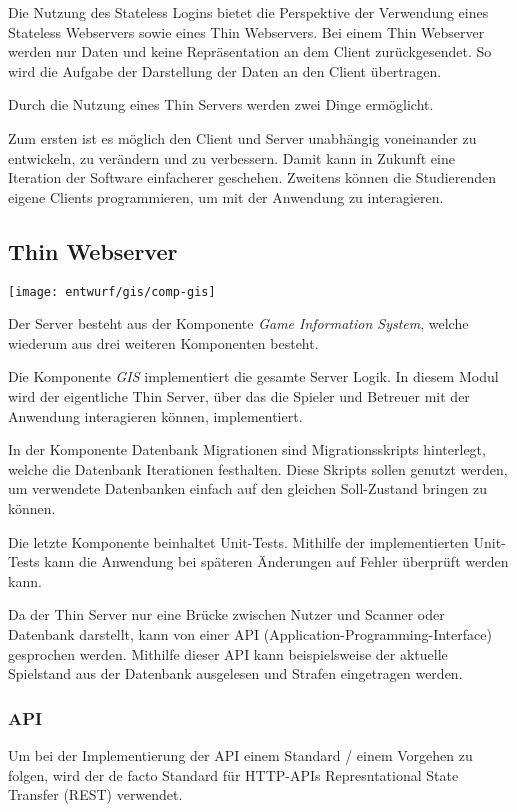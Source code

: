 Die Nutzung des Stateless Logins bietet die Perspektive der Verwendung eines Stateless Webservers sowie eines Thin Webservers. Bei einem Thin Webserver werden nur Daten und keine Repräsentation an dem Client zurückgesendet. So wird die Aufgabe der Darstellung der Daten an den Client übertragen.

Durch die Nutzung eines Thin Servers werden zwei Dinge ermöglicht. 

Zum ersten ist es möglich den Client und Server unabhängig voneinander zu entwickeln, zu verändern und zu verbessern. Damit kann in Zukunft eine Iteration der Software einfacherer geschehen. Zweitens können die Studierenden eigene Clients programmieren, um mit der Anwendung zu interagieren.

\subsection{Thin Webserver}
\begin{center}
	\texttt{[image: entwurf/gis/comp-gis]}
\end{center}

Der Server besteht aus der Komponente \textit{Game Information System}, welche wiederum aus drei weiteren Komponenten besteht. 

Die Komponente \textit{GIS} implementiert die gesamte Server Logik. In diesem Modul wird der eigentliche Thin Server, über das die Spieler und Betreuer mit der Anwendung interagieren können, implementiert.

In der Komponente Datenbank Migrationen sind Migrationsskripts hinterlegt, welche die Datenbank Iterationen festhalten. Diese Skripts sollen genutzt werden, um verwendete Datenbanken einfach auf den gleichen Soll-Zustand bringen zu können. 

Die letzte Komponente beinhaltet Unit-Tests. Mithilfe der implementierten Unit-Tests kann die Anwendung bei späteren Änderungen auf Fehler überprüft werden kann.


Da der Thin Server nur eine Brücke zwischen Nutzer und Scanner oder Datenbank darstellt, kann von einer API (Application-Programming-Interface) gesprochen werden. Mithilfe dieser API kann beispielsweise der aktuelle Spielstand aus der Datenbank ausgelesen und Strafen eingetragen werden.

\subsubsection{API}
Um bei der Implementierung der API einem Standard / einem Vorgehen zu folgen, wird der de facto Standard für HTTP-APIs Represntational State Transfer (REST) verwendet.


